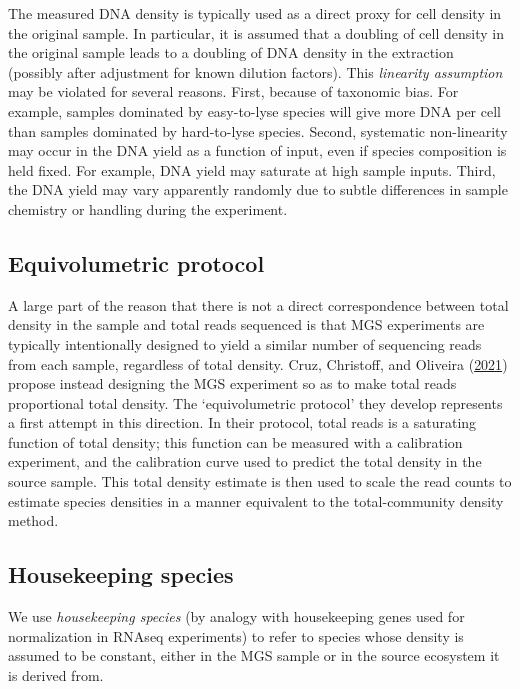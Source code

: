 \documentclass[
]{article}
\begin{document}
The measured DNA density is typically used as a direct proxy for cell density in the original sample.
In particular, it is assumed that a doubling of cell density in the original sample leads to a doubling of DNA density in the extraction (possibly after adjustment for known dilution factors).
This \emph{linearity assumption} may be violated for several reasons.
First, because of taxonomic bias.
For example, samples dominated by easy-to-lyse species will give more DNA per cell than samples dominated by hard-to-lyse species.
Second, systematic non-linearity may occur in the DNA yield as a function of input, even if species composition is held fixed.
For example, DNA yield may saturate at high sample inputs.
Third, the DNA yield may vary apparently randomly due to subtle differences in sample chemistry or handling during the experiment.

\hypertarget{equivolumetric-protocol}{%
\subsection{Equivolumetric protocol}\label{equivolumetric-protocol}}

A large part of the reason that there is not a direct correspondence between total density in the sample and total reads sequenced is that MGS experiments are typically intentionally designed to yield a similar number of sequencing reads from each sample, regardless of total density.
Cruz, Christoff, and Oliveira (\protect\hyperlink{ref-cruz2021equi}{2021}) propose instead designing the MGS experiment so as to make total reads proportional total density.
The `equivolumetric protocol' they develop represents a first attempt in this direction.
In their protocol, total reads is a saturating function of total density; this function can be measured with a calibration experiment, and the calibration curve used to predict the total density in the source sample.
This total density estimate is then used to scale the read counts to estimate species densities in a manner equivalent to the total-community density method.

\hypertarget{housekeeping-species}{%
\subsection{Housekeeping species}\label{housekeeping-species}}

We use \emph{housekeeping species} (by analogy with housekeeping genes used for normalization in RNAseq experiments) to refer to species whose density is assumed to be constant, either in the MGS sample or in the source ecosystem it is derived from.
\end{document}
